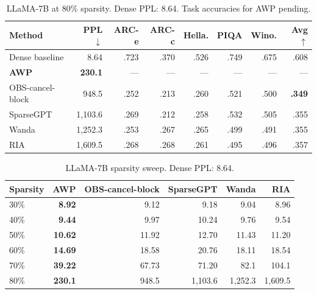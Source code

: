 \documentclass{article}
\begin{document}
\begin{table}[htbp]
  \centering
  \caption{LLaMA-7B at 80\% sparsity. Dense PPL: 8.64. Task accuracies for AWP pending.}
  \label{tab:llama_80}
  \small
  \begin{tabular}{lrrrrrrr}
    \toprule
    Method & PPL$\downarrow$ & ARC-e & ARC-c & Hella. & PIQA & Wino. & Avg$\uparrow$ \\
    \midrule
    Dense baseline            & 8.64      & .723 & .370 & .526 & .749 & .675 & .608 \\
    \midrule
    \textbf{AWP}              & \textbf{230.1} & ---  & ---  & ---  & ---  & ---  & ---  \\
    OBS-cancel-block          & 948.5     & .252 & .213 & .260 & .521 & .500 & \textbf{.349} \\
    SparseGPT                 & 1{,}103.6 & .269 & .212 & .258 & .532 & .505 & .355 \\
    Wanda                     & 1{,}252.3 & .253 & .267 & .265 & .499 & .491 & .355 \\
    RIA                       & 1{,}609.5 & .268 & .268 & .261 & .495 & .496 & .357 \\
    \bottomrule
  \end{tabular}
\end{table}

\begin{table}[htbp]
  \centering
  \caption{LLaMA-7B sparsity sweep. Dense PPL: 8.64.}
  \label{tab:llama_sweep}
  \small
  \begin{tabular}{lrrrrr}
    \toprule
    Sparsity & AWP & OBS-cancel-block & SparseGPT & Wanda & RIA \\
    \midrule
    30\% & \textbf{8.92}  & 9.12           & 9.18           & 9.04           & 8.96           \\
    40\% & \textbf{9.44}  & 9.97           & 10.24          & 9.76           & 9.54           \\
    50\% & \textbf{10.62} & 11.92          & 12.70          & 11.43          & 11.20          \\
    60\% & \textbf{14.69} & 18.58          & 20.76          & 18.11          & 18.54          \\
    70\% & \textbf{39.22} & 67.73          & 71.20          & 82.1           & 104.1          \\
    80\% & \textbf{230.1} & 948.5          & 1{,}103.6      & 1{,}252.3      & 1{,}609.5      \\
    \bottomrule
  \end{tabular}
\end{table}
\end{document}
